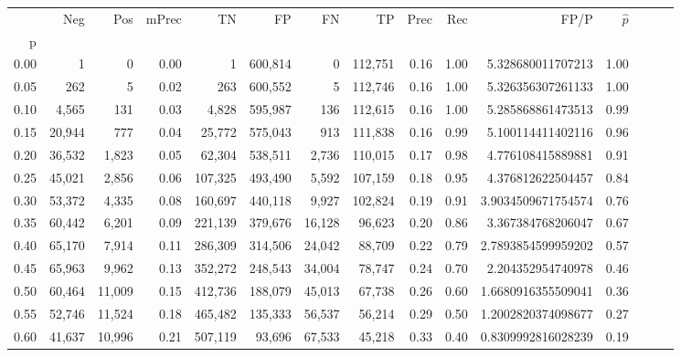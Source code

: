 \begin{tabular}{rrrrrrrrrrrrrrr}
\toprule
{} &     Neg &     Pos & mPrec &       TN &       FP &       FN &       TP &  Prec &   Rec &                   FP/P & $\hat{p}$ \\
p    &         &         &       &          &          &          &          &       &       &                        &           \\
\midrule
0.00 &       1 &       0 &  0.00 &        1 &  600,814 &        0 &  112,751 &  0.16 &  1.00 &      5.328680011707213 &      1.00 \\
0.05 &     262 &       5 &  0.02 &      263 &  600,552 &        5 &  112,746 &  0.16 &  1.00 &      5.326356307261133 &      1.00 \\
0.10 &   4,565 &     131 &  0.03 &    4,828 &  595,987 &      136 &  112,615 &  0.16 &  1.00 &      5.285868861473513 &      0.99 \\
0.15 &  20,944 &     777 &  0.04 &   25,772 &  575,043 &      913 &  111,838 &  0.16 &  0.99 &      5.100114411402116 &      0.96 \\
0.20 &  36,532 &   1,823 &  0.05 &   62,304 &  538,511 &    2,736 &  110,015 &  0.17 &  0.98 &      4.776108415889881 &      0.91 \\
0.25 &  45,021 &   2,856 &  0.06 &  107,325 &  493,490 &    5,592 &  107,159 &  0.18 &  0.95 &      4.376812622504457 &      0.84 \\
0.30 &  53,372 &   4,335 &  0.08 &  160,697 &  440,118 &    9,927 &  102,824 &  0.19 &  0.91 &     3.9034509671754574 &      0.76 \\
0.35 &  60,442 &   6,201 &  0.09 &  221,139 &  379,676 &   16,128 &   96,623 &  0.20 &  0.86 &      3.367384768206047 &      0.67 \\
0.40 &  65,170 &   7,914 &  0.11 &  286,309 &  314,506 &   24,042 &   88,709 &  0.22 &  0.79 &     2.7893854599959202 &      0.57 \\
0.45 &  65,963 &   9,962 &  0.13 &  352,272 &  248,543 &   34,004 &   78,747 &  0.24 &  0.70 &      2.204352954740978 &      0.46 \\
0.50 &  60,464 &  11,009 &  0.15 &  412,736 &  188,079 &   45,013 &   67,738 &  0.26 &  0.60 &     1.6680916355509041 &      0.36 \\
0.55 &  52,746 &  11,524 &  0.18 &  465,482 &  135,333 &   56,537 &   56,214 &  0.29 &  0.50 &     1.2002820374098677 &      0.27 \\
0.60 &  41,637 &  10,996 &  0.21 &  507,119 &   93,696 &   67,533 &   45,218 &  0.33 &  0.40 &     0.8309992816028239 &      0.19 \\

\end{tabular}
